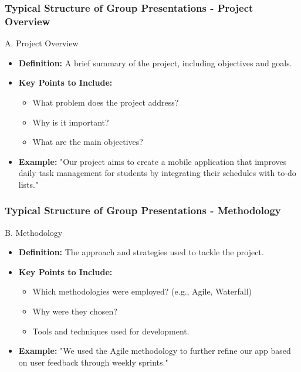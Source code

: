 \documentclass{beamer}
\begin{document}
\begin{frame}[fragile]
    \frametitle{Typical Structure of Group Presentations - Project Overview}
    \begin{block}{A. Project Overview}
        \begin{itemize}
            \item \textbf{Definition:} A brief summary of the project, including objectives and goals.
            \item \textbf{Key Points to Include:}
                \begin{itemize}
                    \item What problem does the project address?
                    \item Why is it important?
                    \item What are the main objectives?
                \end{itemize}
            \item \textbf{Example:} "Our project aims to create a mobile application that improves daily task management for students by integrating their schedules with to-do lists."
        \end{itemize}
    \end{block}
\end{frame}

\begin{frame}[fragile]
    \frametitle{Typical Structure of Group Presentations - Methodology}
    \begin{block}{B. Methodology}
        \begin{itemize}
            \item \textbf{Definition:} The approach and strategies used to tackle the project.
            \item \textbf{Key Points to Include:}
                \begin{itemize}
                    \item Which methodologies were employed? (e.g., Agile, Waterfall)
                    \item Why were they chosen?
                    \item Tools and techniques used for development.
                \end{itemize}
            \item \textbf{Example:} "We used the Agile methodology to further refine our app based on user feedback through weekly sprints."
        \end{itemize}
    \end{block}
\end{frame}
\end{document}
